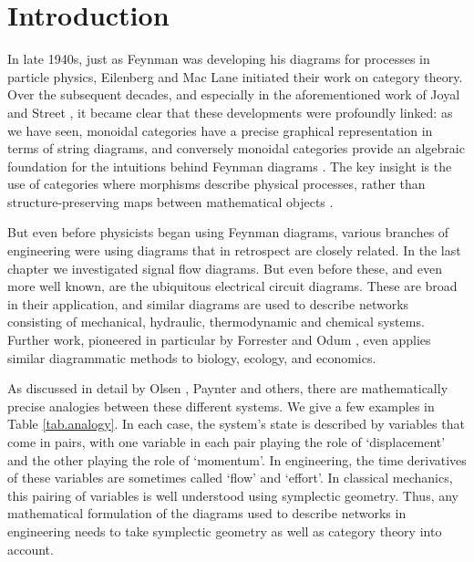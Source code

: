 \section{Introduction}\label{sec:intro}
In late 1940s, just as Feynman was developing his diagrams for processes in
particle physics, Eilenberg and Mac Lane initiated their work on category
theory.  Over the subsequent decades, and especially in the aforementioned work
of Joyal and Street \cite{JS91,JS93}, it became clear that these developments were
profoundly linked: as we have seen, monoidal categories have a precise graphical
representation in terms of string diagrams, and conversely monoidal categories
provide an algebraic foundation for the intuitions behind Feynman diagrams
\cite{BaezStay}.  The key insight is the use of categories where morphisms
describe physical processes, rather than structure-preserving maps between
mathematical objects \cite{CP}.

But even before physicists began using Feynman diagrams, various branches of
engineering were using diagrams that in retrospect are closely related. In the
last chapter we investigated signal flow diagrams. But even before these, and
even more well known, are the ubiquitous electrical circuit diagrams. These are
broad in their application, and similar diagrams are used to describe networks
consisting of mechanical, hydraulic, thermodynamic and chemical systems.
Further work, pioneered in particular by Forrester \cite{Fo} and Odum \cite{Od},
even applies similar diagrammatic methods to biology, ecology, and economics.

As discussed in detail by Olsen \cite{Ol}, Paynter \cite{Pa} and others, there
are mathematically precise analogies between these different systems. We give a
few examples in Table \ref{tab.analogy}. In each case, the system's state is
described by variables that come in pairs, with one variable in each pair
playing the role of  `displacement' and the other playing the role of
`momentum'.  In engineering, the time derivatives of these variables are
sometimes called `flow' and `effort'.    In classical mechanics, this pairing of
variables is well understood using symplectic geometry.  Thus, any mathematical
formulation of the diagrams used to describe networks in engineering needs to
take symplectic geometry as well as category theory into account. 


